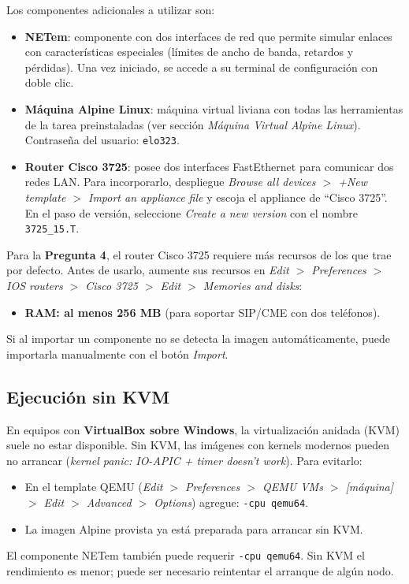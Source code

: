 \documentclass[letterpaper,12pt]{article}
\begin{document}
Los componentes adicionales a utilizar son:

\begin{itemize}
    \item \textbf{NETem}: componente con dos interfaces de red que permite simular enlaces con características especiales (límites de ancho de banda, retardos y pérdidas). Una vez iniciado, se accede a su terminal de configuración con doble clic.
    \item \textbf{Máquina Alpine Linux}: máquina virtual liviana con todas las herramientas de la tarea preinstaladas (ver sección \textit{Máquina Virtual Alpine Linux}). Contraseña del usuario: \texttt{elo323}.
    \item \textbf{Router Cisco 3725}: posee dos interfaces FastEthernet para comunicar dos redes LAN. Para incorporarlo, despliegue \textit{Browse all devices $>$ +New template $>$ Import an appliance file} y escoja el appliance de ``Cisco 3725''. En el paso de versión, seleccione \textit{Create a new version} con el nombre \texttt{3725\_15.T}.
\end{itemize}

\begin{nota}
Para la \textbf{Pregunta 4}, el router Cisco 3725 requiere más recursos de los que trae por defecto. Antes de usarlo, aumente sus recursos en \textit{Edit $>$ Preferences $>$ IOS routers $>$ Cisco 3725 $>$ Edit $>$ Memories and disks}:
\begin{itemize}[leftmargin=1.2cm]
    \item \textbf{RAM: al menos 256 MB} (para soportar SIP/CME con dos teléfonos).
\end{itemize}
\end{nota}

\begin{nota}
Si al importar un componente no se detecta la imagen automáticamente, puede importarla manualmente con el botón \textit{Import}.
\end{nota}

\subsection{Ejecución sin KVM}

En equipos con \textbf{VirtualBox sobre Windows}, la virtualización anidada (KVM) suele no estar disponible. Sin KVM, las imágenes con kernels modernos pueden no arrancar (\textit{kernel panic: IO-APIC + timer doesn't work}). Para evitarlo:
\begin{itemize}[leftmargin=1.2cm]
    \item En el template QEMU (\textit{Edit $>$ Preferences $>$ QEMU VMs $>$ [máquina] $>$ Edit $>$ Advanced $>$ Options}) agregue: \texttt{-cpu qemu64}.
    \item La imagen Alpine provista ya está preparada para arrancar sin KVM.
\end{itemize}
El componente NETem también puede requerir \texttt{-cpu qemu64}. Sin KVM el rendimiento es menor; puede ser necesario reintentar el arranque de algún nodo.
\end{document}
